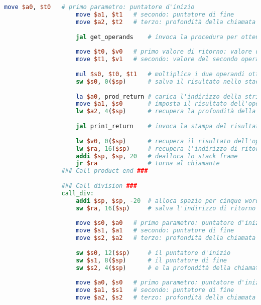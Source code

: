 \begin{center}
\begin{lstlisting}[language=mips, gobble=14, stepnumber=1]
                    move $a0, $t0   # primo parametro: puntatore d'inizio
                    move $a1, $t1   # secondo: puntatore di fine
                    move $a2, $t2   # terzo: profondità della chiamata
                    
                    jal get_operands    # invoca la procedura per ottenere gli operandi
                    
                    move $t0, $v0   # primo valore di ritorno: valore del primo operando
                    move $t1, $v1   # secondo: valore del secondo operando
                    
                    mul $s0, $t0, $t1   # moltiplica i due operandi ottenuti
                    sw $s0, 0($sp)      # salva il risultato nello stack
                    
                    la $a0, prod_return # carica l'indirizzo della stringa prod_return (primo parametro)
                    move $a1, $s0       # imposta il risultato dell'operazione come secondo parametro
                    lw $a2, 4($sp)      # recupera la profondità della chiamata (terzo parametro)
                    
                    jal print_return    # invoca la stampa del risultato con questi tre parametri
                    
                    lw $v0, 0($sp)      # recupera il risultato dell'operazione
                    lw $ra, 16($sp)     # recupera l'indirizzo di ritorno
                    addi $sp, $sp, 20   # dealloca lo stack frame
                    jr $ra              # torna al chiamante
                ### Call product end ###
                
                ### Call division ###
                call_div:
                    addi $sp, $sp, -20  # alloca spazio per cinque words nello stack frame
                    sw $ra, 16($sp)     # salva l'indirizzo di ritorno nello stack
                    
                    move $s0, $a0   # primo parametro: puntatore d'inizio
                    move $s1, $a1   # secondo: puntatore di fine
                    move $s2, $a2   # terzo: profondità della chiamata
                    
                    sw $s0, 12($sp)     # il puntatore d'inizio
                    sw $s1, 8($sp)      # il puntatore di fine
                    sw $s2, 4($sp)      # e la profondità della chiamata
                    
                    move $a0, $s0   # primo parametro: puntatore d'inizio
                    move $a1, $s1   # secondo: puntatore di fine
                    move $a2, $s2   # terzo: profondità della chiamata
                    

\end{lstlisting}
\end{center}
